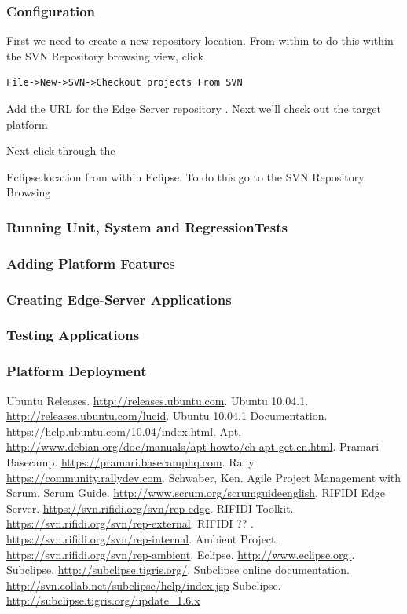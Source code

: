 \documentclass[11pt]{article}
\begin{document}
\subsubsection{ Configuration}

First we need to create a new repository location.  From within to do this within the SVN Repository browsing view, click 
\begin{verbatim}  
File->New->SVN->Checkout projects From SVN
\end{verbatim}

Add the URL for the Edge Server repository \cite{rep-edge}.  Next we'll check out the target platform

Next click through the 


Eclipse.location from within Eclipse.  To do this go to the SVN Repository Browsing

\subsubsection{Running Unit, System and RegressionTests}
\subsubsection{Adding Platform Features}
\subsubsection{Creating Edge-Server Applications}
\subsubsection{Testing Applications}
\subsubsection{Platform Deployment}

\begin{thebibliography}{99}
 Ubuntu Releases.  \url{http://releases.ubuntu.com}.
 Ubuntu 10.04.1.  \url{http://releases.ubuntu.com/lucid}.
 Ubuntu 10.04.1 Documentation. \url{https://help.ubuntu.com/10.04/index.html}.
 Apt.  \url{http://www.debian.org/doc/manuals/apt-howto/ch-apt-get.en.html}.
 Pramari Basecamp.  \url{https://pramari.basecamphq.com}.
  Rally.  \url{https://community.rallydev.com}.
  Schwaber, Ken. Agile Project Management with Scrum.
 Scrum Guide.  \url{http://www.scrum.org/scrumguideenglish}. 
 RIFIDI Edge Server. \url{https://svn.rifidi.org/svn/rep-edge}.
 RIFIDI Toolkit. \url{https://svn.rifidi.org/svn/rep-external}.
 RIFIDI ?? . \url{https://svn.rifidi.org/svn/rep-internal}.
 Ambient Project. \url{https://svn.rifidi.org/svn/rep-ambient}.
 Eclipse.  \url{http://www.eclipse.org.}.
 Subclipse.  \url{http://subclipse.tigris.org/}.
 Subclipse online documentation.  \url{http://svn.collab.net/subclipse/help/index.jsp}
 Subclipse.  \url{http://subclipse.tigris.org/update_1.6.x}
\end{thebibliography}
\end{document}
